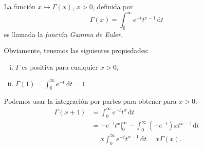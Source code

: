 \begin{definition}
La función $x\mapsto \Gamma(x)$, $x>0$, definida por
\begin{equation}
\Gamma(x)=\int_{0}^{\infty}e^{-t}t^{x-1}\,\mathrm{d}t
\end{equation}
es llamada la \emph{función Gamma de Euler}.
\end{definition}
Obviamente, tenemos las siguientes propiedades:
\begin{enumerate}[(i)]
	\item $\Gamma$ es positiva para cualquier $x>0$,
	\item $\Gamma(1)=\int_0^\infty e^{-t}\,\mathrm{d}t=1$.
\end{enumerate}
Podemos usar la integración por partes para obtener para $x>0$:
\begin{align*}
\Gamma(x+1) &= \int_{0}^{\infty}e^{-t}t^{x}\,\mathrm{d}t\\
						&=-e^{-t}t^{x}\Big|_0^\infty - \int_{0}^{\infty}\left(-e^{-t}\right)xt^{x-1}\,\mathrm{d}t\\
						&=x\int_{0}^{\infty}e^{-t}t^{x-1}\,\mathrm{d}t=x\Gamma(x).
\end{align*}